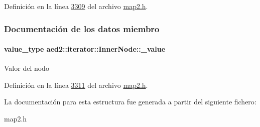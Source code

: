 \-Definición en la línea \hyperlink{map2_8h_source_l03309}{3309} del archivo \hyperlink{map2_8h_source}{map2.\-h}.



\subsubsection{\-Documentación de los datos miembro}
\hypertarget{structaed2_1_1iterator_1_1InnerNode_a3d80723a2dd1b746c0687f39fbc3d5e2_a3d80723a2dd1b746c0687f39fbc3d5e2}{
\paragraph[{\-\_\-value}]{\setlength{\rightskip}{0pt plus 5cm}value\-\_\-type {\bf aed2\-::iterator\-::\-Inner\-Node\-::\-\_\-value}}}\label{structaed2_1_1iterator_1_1InnerNode_a3d80723a2dd1b746c0687f39fbc3d5e2_a3d80723a2dd1b746c0687f39fbc3d5e2}
\-Valor del nodo 

\-Definición en la línea \hyperlink{map2_8h_source_l03311}{3311} del archivo \hyperlink{map2_8h_source}{map2.\-h}.



\-La documentación para esta estructura fue generada a partir del siguiente fichero\-:\begin{DoxyCompactItemize}
\item 
map2.\-h\end{DoxyCompactItemize}
